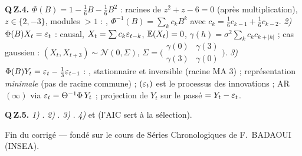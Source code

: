 \documentclass[11pt]{article}
\begin{document}
\textbf{Q\,Z.4.} $\Phi(B)=1-\tfrac16B-\tfrac16B^2$ : racines de $z^2+z-6=0$ (après
multiplication), $z\in\{2,-3\}$, modules $>1$ : ,
$\Phi^{-1}(B)=\sum_kc_kB^k$ avec $c_k=\tfrac16c_{k-1}+\tfrac16c_{k-2}$.
\emph{2)} $\Phi(B)X_t=\varepsilon_t$ :  causal, $X_t=\sum c_k\varepsilon_{t-k}$, $\mathbb{E}(X_t)=0$,
$\gamma(h)=\sigma^2\sum_kc_kc_{k+|h|}$ ; cas gaussien : $(X_t,X_{t+3})\sim\mathcal N(0,\Sigma)$,
$\Sigma=\big(\begin{smallmatrix}\gamma(0)&\gamma(3)\\\gamma(3)&\gamma(0)\end{smallmatrix}\big)$.
\emph{3)} $\Phi(B)Y_t=\varepsilon_t-\tfrac13\varepsilon_{t-1}$ : , stationnaire et inversible
(racine MA $3$) ; représentation \emph{minimale} (pas de racine commune) ; $(\varepsilon_t)$ est le
processus des innovations ; AR$(\infty)$ via $\varepsilon_t=\Theta^{-1}\Phi\,Y_t$ ; projection de
$Y_t$ sur le passé $=Y_t-\varepsilon_t$.

\textbf{Q\,Z.5.} \emph{1)} . \emph{2)} . \emph{3)} . \emph{4)}  et  (l'AIC sert à la
sélection).

\vfill
\begin{center}\small\color{gris}
Fin du corrigé --- fondé sur le cours de Séries Chronologiques de F.~BADAOUI (INSEA).
\end{center}
\end{document}
